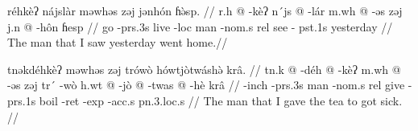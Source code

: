 \pex
\a
\begingl
\glpreamble réhkèʔ nájslàr məwhəs zəj jənhón ɦə̀sp. //
\gla r.h @ -kèʔ n´js @ -lár m.wh @ -əs zəj j.n @ -hôn ɦesp //
\glb go -{\sc prs}.3s live -{\sc loc} man -{\sc nom}.s {\sc rel} see -{\sc
pst}.1s yesterday //
\glft The man that I saw yesterday went home.//
\endgl

\a
\begingl
\glpreamble tnəkdéhkèʔ məwhəs zəj trówò hówtjòtwáshə̀ krâ. //
\gla tn.k @ -déh @ -kèʔ m.wh @ -əs zəj tr´ -wò h.wt @ -jò @ -twas @
-hè krâ //
\glb {[be ill]} -{\sc inch} -{\sc prs}.3s man -{\sc nom}.s {\sc rel} give -{\sc
prs}.1s boil -{\sc ret} -{\sc exp} -{\sc acc}.s {\sc pn}.3.{\sc loc}.s //
\glft The man that I gave the tea to got sick. //
\endgl
\xe

